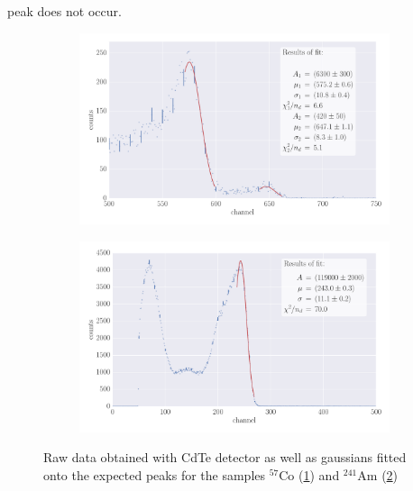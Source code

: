 peak does not occur. 
\begin{figure}
    \centering
    \begin{subfigure}[b]{\pltw}
        \includegraphics[width=1.0\linewidth]{figures/detector_Co_CdTe}
        \caption{}
        \label{fig:detector_Co_CdTe}
    \end{subfigure}
    \begin{subfigure}[b]{\pltw}
        \includegraphics[width=1.0\linewidth]{figures/detector_Am_CdTe}
        \caption{}
        \label{fig:detector_Am_CdTe}
    \end{subfigure}
    \caption{
        Raw data obtained with CdTe detector as well as gaussians fitted 
        onto the expected peaks for the samples $^{57}$Co (\ref{fig:detector_Co_CdTe})
        and $^{241}$Am (\ref{fig:detector_Am_CdTe})
        }
    \label{fig:detector_CdTe}
\end{figure}

